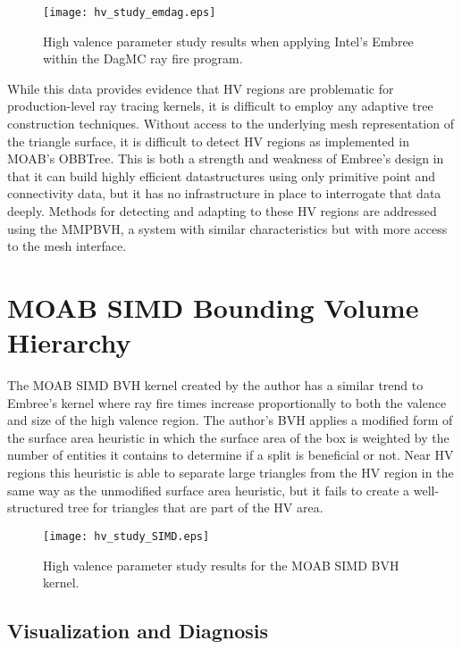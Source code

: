 \begin{figure}[H]
  \centering
    \texttt{[image: hv\_study\_emdag.eps]}
    \caption{High valence parameter study results when applying Intel's Embree
      within the DagMC ray fire program.}
    \label{fig:hv_study_emdag}
\end{figure}

While this data provides evidence that HV regions are problematic for
production-level ray tracing kernels, it is difficult to employ any adaptive
tree construction techniques. Without access to the underlying mesh
representation of the triangle surface, it is difficult to detect HV regions as
implemented in MOAB's OBBTree. This is both a strength and weakness of Embree's
design in that it can build highly efficient datastructures using only primitive
point and connectivity data, but it has no infrastructure in place to
interrogate that data deeply. Methods for detecting and adapting to these HV
regions are addressed using the MMPBVH, a system with similar characteristics
but with more access to the mesh interface.

\section{MOAB SIMD Bounding Volume Hierarchy}\label{sec:simd_hv_study}

The MOAB SIMD BVH kernel created by the author has a similar trend to Embree's
kernel where ray fire times increase proportionally to both the valence and size
of the high valence region. The author's BVH applies a modified form of the
surface area heuristic in which the surface area of the box is weighted by the
number of entities it contains to determine if a split is beneficial or
not. Near HV regions this heuristic is able to separate large triangles from the
HV region in the same way as the unmodified surface area heuristic, but it
fails to create a well-structured tree for triangles that are part of the HV area.

\begin{figure}[H]
  \centering
    \texttt{[image: hv\_study\_SIMD.eps]}
    \caption{High valence parameter study results for the MOAB SIMD BVH kernel.}
    \label{fig:hv_study_simd}
\end{figure}

\subsection{Visualization and Diagnosis}

